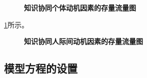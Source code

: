 \begin{figure}[!htb]
  \centering
  \caption{\small{\textbf{知识协同个体动机因素的存量流量图}}}
  \label{fig:refined-model}
\end{figure}

\ref{fig:refined-model}所示。
\begin{figure}[!htb]
  \centering
  \caption{\small{\textbf{知识协同人际间动机因素的存量流量图}}}
  \label{fig:refined-model2}
\end{figure}

\subsection{模型方程的设置}


